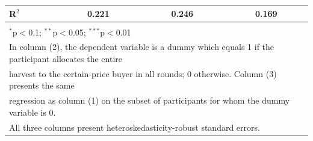\begin{table}[!htbp]
\begin{tabular}{@{\extracolsep{5pt}}lccc}
R$^{2}$ & 0.221 & 0.246 & 0.169 \\ 
\hline 
\hline \\[-1.8ex] 
\multicolumn{4}{l}{$^{*}$p$<$0.1; $^{**}$p$<$0.05; $^{***}$p$<$0.01} \\ 
\multicolumn{4}{l}{In column (2), the dependent variable is a dummy which equals 1 if the participant allocates the entire} \\ 
\multicolumn{4}{l}{harvest to the certain-price buyer in all rounds; 0 otherwise. Column (3) presents the same} \\ 
\multicolumn{4}{l}{regression as column (1) on the subset of participants for whom the dummy variable is 0.} \\ 
\multicolumn{4}{l}{All three columns present heteroskedasticity-robust standard errors.} \\ 
\end{tabular} 
\end{table} 
